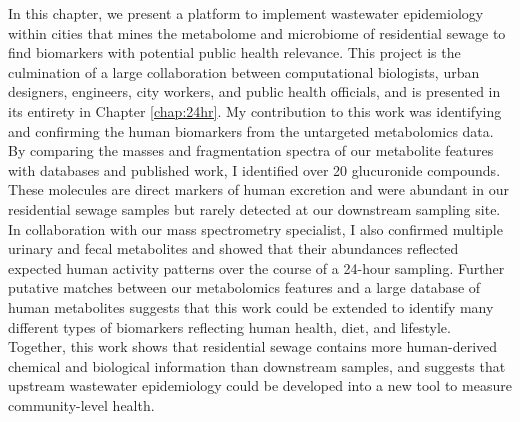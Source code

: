 In this chapter, we present a platform to implement wastewater epidemiology within cities that mines the metabolome and microbiome of residential sewage to find biomarkers with potential public health relevance.
This project is the culmination of a large collaboration between computational biologists, urban designers, engineers, city workers, and public health officials, and is presented in its entirety in Chapter \ref{chap:24hr}.
My contribution to this work was identifying and confirming the human biomarkers from the untargeted metabolomics data.
By comparing the masses and fragmentation spectra of our metabolite features with databases and published work, I identified over 20 glucuronide compounds.
These molecules are direct markers of human excretion and were abundant in our residential sewage samples but rarely detected at our downstream sampling site.
In collaboration with our mass spectrometry specialist, I also confirmed multiple urinary and fecal metabolites and showed that their abundances reflected expected human activity patterns over the course of a 24-hour sampling.
Further putative matches between our metabolomics features and a large database of human metabolites \cite{hmdb} suggests that this work could be extended to identify many different types of biomarkers reflecting human health, diet, and lifestyle.
Together, this work shows that residential sewage contains more human-derived chemical and biological information than downstream samples, and suggests that upstream wastewater epidemiology could be developed into a new tool to measure community-level health.

\begin{singlespace}


\end{singlespace}
